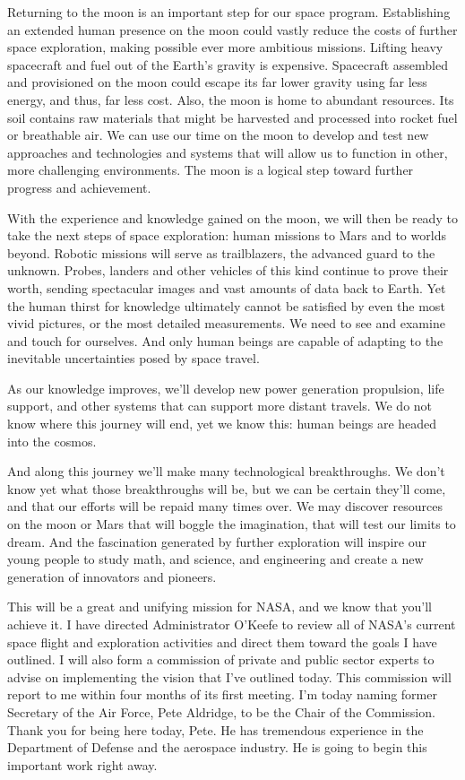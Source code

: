 \documentclass[11pt,a4paper]{article}
\begin{document}
Returning to the moon is an important step for our space program. Establishing an extended human presence on the moon could vastly reduce the costs of further space exploration, making possible ever more ambitious missions. Lifting heavy spacecraft and fuel out of the Earth’s gravity is expensive. Spacecraft assembled and provisioned on the moon could escape its far lower gravity using far less energy, and thus, far less cost. Also, the moon is home to abundant resources. Its soil contains raw materials that might be harvested and processed into rocket fuel or breathable air. We can use our time on the moon to develop and test new approaches and technologies and systems that will allow us to function in other, more challenging environments. The moon is a logical step toward further progress and achievement.

With the experience and knowledge gained on the moon, we will then be ready to take the next steps of space exploration: human missions to Mars and to worlds beyond. Robotic missions will serve as trailblazers, the advanced guard to the unknown. Probes, landers and other vehicles of this kind continue to prove their worth, sending spectacular images and vast amounts of data back to Earth. Yet the human thirst for knowledge ultimately cannot be satisfied by even the most vivid pictures, or the most detailed measurements. We need to see and examine and touch for ourselves. And only human beings are capable of adapting to the inevitable uncertainties posed by space travel.

As our knowledge improves, we’ll develop new power generation propulsion, life support, and other systems that can support more distant travels. We do not know where this journey will end, yet we know this: human beings are headed into the cosmos.

And along this journey we’ll make many technological breakthroughs. We don’t know yet what those breakthroughs will be, but we can be certain they’ll come, and that our efforts will be repaid many times over. We may discover resources on the moon or Mars that will boggle the imagination, that will test our limits to dream. And the fascination generated by further exploration will inspire our young people to study math, and science, and engineering and create a new generation of innovators and pioneers.

This will be a great and unifying mission for NASA, and we know that you’ll achieve it. I have directed Administrator O’Keefe to review all of NASA’s current space flight and exploration activities and direct them toward the goals I have outlined. I will also form a commission of private and public sector experts to advise on implementing the vision that I’ve outlined today. This commission will report to me within four months of its first meeting. I’m today naming former Secretary of the Air Force, Pete Aldridge, to be the Chair of the Commission. Thank you for being here today, Pete. He has tremendous experience in the Department of Defense and the aerospace industry. He is going to begin this important work right away.
\end{document}
